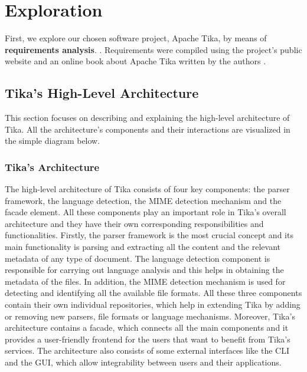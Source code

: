 \documentclass{article}
\begin{document}
\section{Exploration}
First, we explore our chosen software project, Apache Tika, by means of \textbf{requirements analysis}. \citep{dresner1964maintenance}. Requirements were compiled using the project's public website \citep{apache_software_foundation_2020} and an online book about Apache Tika written by the authors \citep{tika_in_action}. 
\subsection{Tika's High-Level Architecture}
This section focuses on describing and explaining the high-level architecture of Tika. All the architecture’s components and their interactions are visualized in the simple diagram below.
\subsubsection{Tika's Architecture}
The high-level architecture of Tika consists of four key components: the parser framework, the language detection, the MIME detection mechanism and the facade element. All these components play an important role in Tika’s overall architecture and they have their own corresponding responsibilities and functionalities. Firstly, the parser framework is the most crucial concept and its main functionality is parsing and extracting all the content and the relevant metadata of any type of document. The language detection component is responsible for carrying out language analysis and this helps in obtaining the metadata of the files. In addition, the MIME detection mechanism is used for detecting and identifying all the available file formats. All these three components contain their own individual repositories, which help in extending Tika by adding or removing new parsers, file formats or language mechanisms. Moreover, Tika’s architecture contains a facade, which connects all the main components and it provides a user-friendly frontend for the users that want to benefit from Tika’s services. The architecture also consists of some external interfaces like the CLI and the GUI, which allow integrability between users and their applications.
\end{document}
